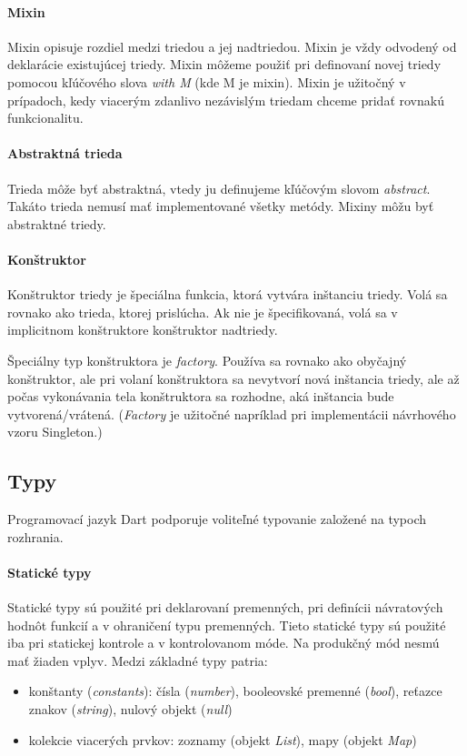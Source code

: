 \paragraph{Mixin}
\label{par:mixins}
Mixin opisuje rozdiel medzi triedou a jej nadtriedou. Mixin je vždy odvodený od deklarácie existujúcej triedy.
Mixin môžeme použiť pri definovaní novej triedy pomocou kľúčového slova \emph{with M} (kde M je mixin).
Mixin je užitočný v prípadoch, kedy viacerým zdanlivo nezávislým triedam chceme pridať rovnakú funkcionalitu.

\paragraph{Abstraktná trieda}
Trieda môže byť abstraktná, vtedy ju definujeme kľúčovým slovom \emph{abstract}. Takáto trieda nemusí mať implementované všetky metódy. Mixiny môžu byť abstraktné triedy.

\paragraph{Konštruktor}
Konštruktor triedy je špeciálna funkcia, ktorá vytvára inštanciu triedy. Volá sa rovnako ako trieda, ktorej prislúcha. 
Ak nie je špecifikovaná, volá sa v implicitnom konštruktore konštruktor nadtriedy. %

\NEW{}
Špeciálny typ konštruktora je \emph{factory}. Používa sa rovnako ako obyčajný konštruktor, ale pri volaní konštruktora sa nevytvorí nová inštancia triedy, ale až počas vykonávania tela konštruktora sa rozhodne, aká inštancia bude vytvorená/vrátená. (\emph{Factory} je užitočné napríklad pri implementácii návrhového vzoru Singleton.)

\subsection{Typy}
\label{subsec:typy}
Programovací jazyk Dart podporuje voliteľné typovanie založené na typoch rozhrania.

\paragraph{Statické typy}
Statické typy sú použité pri deklarovaní premenných, pri definícii návratových hodnôt funkcií a v ohraničení typu premenných. 
Tieto statické typy sú použité iba pri statickej kontrole a v kontrolovanom móde. Na produkčný mód nesmú mať žiaden vplyv.
Medzi základné typy patria:
\begin{itemize}
\item konštanty (\emph{constants}): čísla (\emph{number}), booleovské premenné (\emph{bool}), reťazce znakov (\emph{string}), nulový objekt (\emph{null})
\item kolekcie viacerých prvkov: zoznamy (objekt \emph{List}), mapy (objekt \emph{Map})
\end{itemize}

